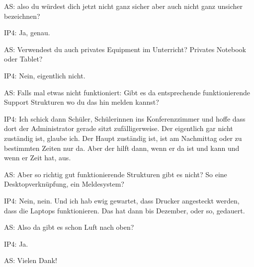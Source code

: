 \documentclass[fontsize=11pt,paper=a4]{scrbook}
\begin{document}
{\begin{itemize*}
\item[AS:] also du würdest
dich jetzt nicht ganz sicher aber auch
nicht ganz unsicher bezeichnen?
\item[IP4:] Ja, genau.
\item[AS:] Verwendest du auch privates Equipment im Unterricht? Privates Notebook oder  Tablet?
\item[IP4:] Nein, eigentlich nicht.
\item[AS:] Falls mal etwas
nicht funktioniert: Gibt es da entsprechende
funktionierende Support Strukturen wo du das hin melden kannst?
\item[IP4:] Ich schick dann Schüler, Schülerinnen ins Konferenzzimmer und hoffe dass dort der Administrator gerade sitzt zufälligerweise.
Der eigentlich gar nicht zuständig ist, glaube ich.
Der Haupt zuständig ist, ist am Nachmittag oder zu bestimmten Zeiten nur da. Aber der hilft dann, wenn er da ist und kann und wenn er Zeit hat, aus. 
\item[AS:] Aber so richtig gut funktionierende Strukturen gibt es nicht? So eine Desktopverknüpfung, ein Meldesystem?
\item[IP4:] Nein, nein.
Und ich hab ewig gewartet, dass Drucker angesteckt werden, dass die Laptops funktionieren. Das hat dann bis Dezember, oder so, gedauert.
\item[AS:] Also da gibt es schon Luft nach oben?
\item[IP4:] Ja.
\item[AS:] Vielen Dank!
\end{itemize*} 
}
\end{document}
